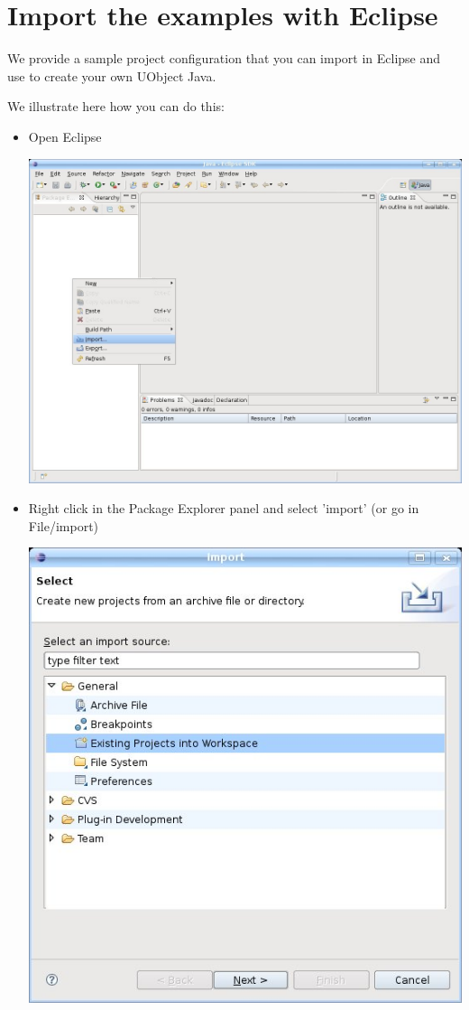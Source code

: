 \section{Import the examples with Eclipse}

We provide a sample 
project configuration that you can import in Eclipse and use to create your
own UObject Java.

We illustrate here how you can do this:

\begin{itemize}
\item Open Eclipse

  \begin{center}
    \includegraphics[width=0.6\linewidth]{img/eclipse-import}
  \end{center}

\item Right click in the Package Explorer panel and select 'import' (or go
  in File/import)

  \begin{center}
    \includegraphics[width=0.6\linewidth]{img/select-import}
  \end{center}


\end{itemize}
